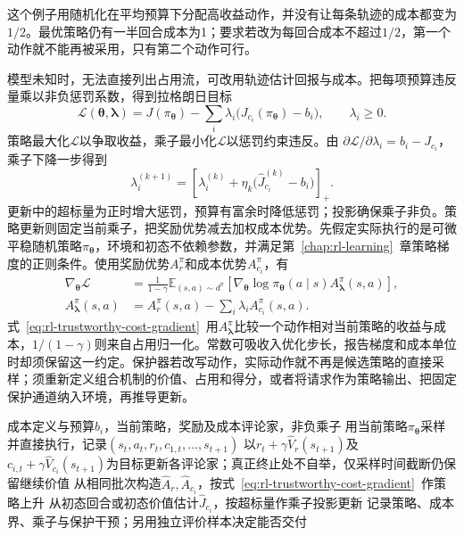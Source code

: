 这个例子用随机化在平均预算下分配高收益动作，并没有让每条轨迹的成本都变为$1/2$。最优策略仍有一半回合成本为1；要求若改为每回合成本不超过$1/2$，第一个动作就不能再被采用，只有第二个动作可行。

模型未知时，无法直接列出占用流，可改用轨迹估计回报与成本。把每项预算违反量乘以非负惩罚系数，得到拉格朗日目标
\begin{equation}
  \mathcal L(\bm{\theta},\bm{\lambda})
    =J(\pi_{\bm{\theta}})
       -\sum_i\lambda_i\bigl(J_{c_i}(\pi_{\bm{\theta}})-b_i\bigr),
  \qquad \lambda_i\geq0.
  \label{eq:rl-trustworthy-lagrangian}
\end{equation}
策略最大化$\mathcal L$以争取收益，乘子最小化$\mathcal L$以惩罚约束违反。由
$\partial\mathcal L/\partial\lambda_i=b_i-J_{c_i}$，乘子下降一步得到
\[
  \lambda_i^{(k+1)}
   =\left[\lambda_i^{(k)}
       +\eta_k\bigl(\widehat J_{c_i}^{(k)}-b_i\bigr)\right]_+.
\]
更新中的超标量为正时增大惩罚，预算有富余时降低惩罚；投影确保乘子非负。策略更新则固定当前乘子，把奖励优势减去加权成本优势。先假定实际执行的是可微平稳随机策略$\pi_{\bm{\theta}}$，环境和初态不依赖参数，并满足第~\ref{chap:rl-learning}~章策略梯度的正则条件。使用奖励优势$A_r^\pi$和成本优势$A_{c_i}^\pi$，有
\begin{equation}
  \begin{aligned}
    \nabla_{\bm{\theta}}\mathcal L
      &=\frac{1}{1-\gamma}
        \mathbb E_{(s,a)\sim d^\pi}
          \left[\nabla_{\bm{\theta}}\log\pi_{\bm{\theta}}(a\mid s)
                 A_{\bm{\lambda}}^\pi(s,a)\right],\\
    A_{\bm{\lambda}}^\pi(s,a)
      &=A_r^\pi(s,a)-\sum_i\lambda_iA_{c_i}^\pi(s,a).
  \end{aligned}
  \label{eq:rl-trustworthy-cost-gradient}
\end{equation}
式~\eqref{eq:rl-trustworthy-cost-gradient}~用$A_{\bm{\lambda}}^\pi$比较一个动作相对当前策略的收益与成本，$1/(1-\gamma)$则来自占用归一化。常数可吸收入优化步长，报告梯度和成本单位时却须保留这一约定。保护器若改写动作，实际动作就不再是候选策略的直接采样；须重新定义组合机制的价值、占用和得分，或者将请求作为策略输出、把固定保护通道纳入环境，再推导更新。

\begin{algorithm}
  \label{alg:rl-trustworthy-primal-dual}
  \begin{algorithmic}[1]
    \Require 成本定义与预算$b_i$，当前策略，奖励及成本评论家，非负乘子
      \State 用当前策略$\pi_{\bm{\theta}}$采样并直接执行，记录$(s_t,a_t,r_t,c_{1,t},\ldots,s_{t+1})$
      \State 以$r_t+\gamma\widehat V_r(s_{t+1})$及$c_{i,t}+\gamma\widehat V_{c_i}(s_{t+1})$为目标更新各评论家；真正终止处不自举，仅采样时间截断仍保留继续价值
      \State 从相同批次构造$\widehat A_r,\widehat A_{c_i}$，按式~\eqref{eq:rl-trustworthy-cost-gradient}~作策略上升
      \State 从初态回合或初态价值估计$\widehat J_{c_i}$，按超标量作乘子投影更新
      \State 记录策略、成本界、乘子与保护干预；另用独立评价样本决定能否交付
    \EndFor
  \end{algorithmic}
\end{algorithm}

